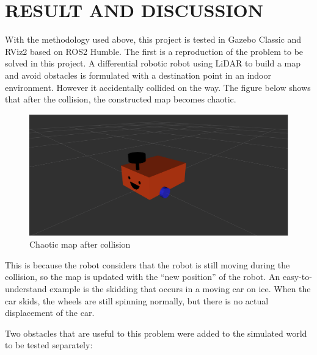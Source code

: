 \section{RESULT AND DISCUSSION}
\label{sec:result_and_discussion}
With the methodology used above, this project is tested in Gazebo Classic and RViz2 based on ROS2 Humble. 
The first is a reproduction of the problem to be solved in this project.
A differential robotic robot using LiDAR to build a map and avoid obstacles is formulated 
with a destination point in an indoor environment. However it accidentally collided on the way. 
The figure below shows that after the collision, the constructed map becomes chaotic.
\begin{figure}[H]
    \centering
    \includegraphics[width=0.8\linewidth]{figs/robot.png}
    \caption{Chaotic map after collision}
\end{figure}
This is because the robot considers that the robot is still moving during the collision,
so the map is updated with the ``new position'' of the robot. An easy-to-understand example is the skidding that occurs in a moving car on ice. 
When the car skids, the wheels are still spinning normally, but there is no actual displacement of the car.

Two obstacles that are useful to this problem were added to the simulated world to be tested separately:

